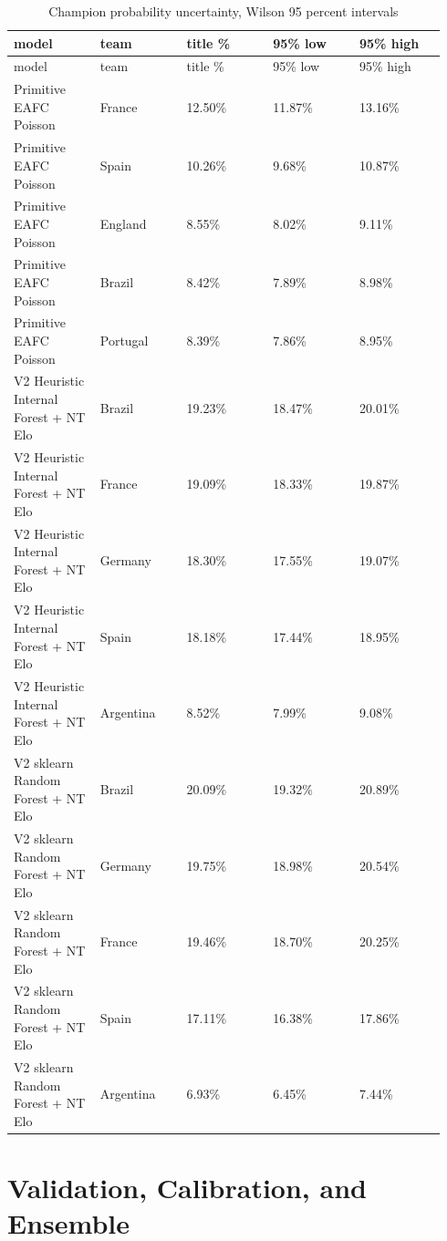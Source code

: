 \documentclass[10pt]{article}
\begin{document}
\begin{longtable}{p{0.188\linewidth}p{0.188\linewidth}p{0.188\linewidth}p{0.188\linewidth}p{0.188\linewidth}}
\caption{Champion probability uncertainty, Wilson 95 percent intervals}\\
\toprule
model & team & title \% & 95\% low & 95\% high \\
\midrule
\endfirsthead
\toprule
model & team & title \% & 95\% low & 95\% high \\
\midrule
\endhead
Primitive EAFC Poisson & France & 12.50\% & 11.87\% & 13.16\% \\
Primitive EAFC Poisson & Spain & 10.26\% & 9.68\% & 10.87\% \\
Primitive EAFC Poisson & England & 8.55\% & 8.02\% & 9.11\% \\
Primitive EAFC Poisson & Brazil & 8.42\% & 7.89\% & 8.98\% \\
Primitive EAFC Poisson & Portugal & 8.39\% & 7.86\% & 8.95\% \\
V2 Heuristic Internal Forest + NT Elo & Brazil & 19.23\% & 18.47\% & 20.01\% \\
V2 Heuristic Internal Forest + NT Elo & France & 19.09\% & 18.33\% & 19.87\% \\
V2 Heuristic Internal Forest + NT Elo & Germany & 18.30\% & 17.55\% & 19.07\% \\
V2 Heuristic Internal Forest + NT Elo & Spain & 18.18\% & 17.44\% & 18.95\% \\
V2 Heuristic Internal Forest + NT Elo & Argentina & 8.52\% & 7.99\% & 9.08\% \\
V2 sklearn Random Forest + NT Elo & Brazil & 20.09\% & 19.32\% & 20.89\% \\
V2 sklearn Random Forest + NT Elo & Germany & 19.75\% & 18.98\% & 20.54\% \\
V2 sklearn Random Forest + NT Elo & France & 19.46\% & 18.70\% & 20.25\% \\
V2 sklearn Random Forest + NT Elo & Spain & 17.11\% & 16.38\% & 17.86\% \\
V2 sklearn Random Forest + NT Elo & Argentina & 6.93\% & 6.45\% & 7.44\% \\
\bottomrule
\end{longtable}


\section{Validation, Calibration, and Ensemble}
\end{document}
